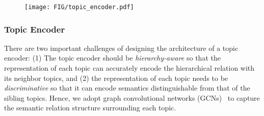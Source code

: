 \begin{figure}[t]
    \centering
    \texttt{[image: FIG/topic\_encoder.pdf]}
    \caption{
    }
    \label{fig:topic_encoder}
\end{figure}

\subsubsection{Topic Encoder}
\label{subsubsec:topic_encoder}
There are two important challenges of designing the architecture of a topic encoder:
(1) The topic encoder should be \textit{hierarchy-aware} so that the representation of each topic can accurately encode the hierarchical relation with its neighbor topics, and
(2) the representation of each topic needs to be \textit{discriminative} so that it can encode semantics distinguishable from that of the sibling topics.
Hence, we adopt graph convolutional networks (GCNs)~\cite{kipf2017semi} to capture the semantic relation structure surrounding each topic.

